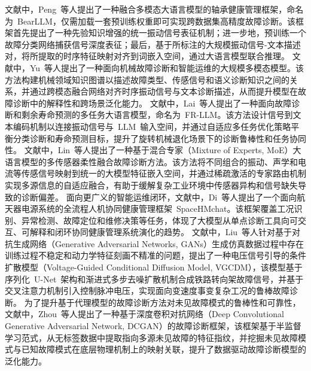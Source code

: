 文献\cite{Peng_Liu_Du_Gao_Wang_2025}中，Peng~等人提出了一种融合多模态大语言模型的轴承健康管理框架，命名为~BearLLM，仅需加载一套预训练权重即可实现跨数据集高精度故障诊断。该框架首先提出了一种先验知识增强的统一振动信号表征机制；进一步地，预训练一个故障分类网络捕获信号深度表征；最后，基于所标注的大规模振动信号-文本描述对，将所提取的时序特征映射对齐到词嵌入空间，通过大语言模型联合推理。
文献\cite{yu2026lmm_fd}中，Yu~等人提出了一种面向机械故障诊断和智能运维的大规模多模态模型。该方法构建机械领域知识图谱以描述故障类型、传感信号和语义诊断知识之间的关系，并通过跨模态融合网络对齐时序振动信号与文本诊断描述，从而提升模型在故障诊断中的解释性和跨场景泛化能力。
文献\cite{lai2026fr_llm}中，Lai~等人提出了一种面向故障诊断和剩余寿命预测的多任务大语言模型，命名为~FR-LLM。该方法设计信号到文本编码机制以连接振动信号与~LLM~输入空间，并通过自适应多任务优化策略平衡分类诊断和寿命预测目标，提升了旋转机械退化场景下的诊断鲁棒性和任务协同性。
文献\cite{lin2026moe_llm}中，Lin~等人提出了一种基于混合专家（Mixture of Experts, MoE）大语言模型的多传感器柔性融合故障诊断方法。该方法将不同组合的振动、声学和电流等传感信号映射到统一的大模型特征嵌入空间，并通过稀疏激活的专家路由机制实现多源信息的自适应融合，有助于缓解复杂工业环境中传感器异构和信号缺失导致的诊断偏差。
面向更广义的智能运维闭环，文献\cite{di2026spacehmchat}中，Di~等人提出了一个面向航天器电源系统的全流程人机协同健康管理框架~SpaceHMchat。该框架覆盖工况识别、异常检测、故障定位和维修决策等任务，体现了大模型从单点诊断工具向可交互、可解释和闭环协同健康管理系统演化的趋势。
文献\cite{VGCDM}中，Liu~等人针对基于对抗生成网络（Generative Adversarial Networks, GANs）生成仿真数据过程中存在训练过程不稳定和动力学特征刻画不精准的问题，提出了一种电压信号引导的条件扩散模型（Voltage-Guided Conditional Diffusion Model, VGCDM），该模型基于序列化~U-Net~架构和渐进式多步去噪扩散机制合成铁路转向架故障信号，并基于交叉注意力机制引入控制脉冲电压，实现面向变速度事变复杂工况的鲁棒故障诊断。
为了提升基于代理模型的故障诊断方法对未见故障模式的鲁棒性和可靠性，文献\cite{DCGAN}中，Zhou~等人提出了一种基于深度卷积对抗网络（Deep Convolutional Generative Adversarial Network, DCGAN）的故障诊断框架，该框架基于半监督学习范式，从无标签数据中提取指向多源未见故障的特征指纹，并挖掘未见故障模式与已知故障模式在底层物理机制上的映射关联，提升了数据驱动故障诊断模型的泛化能力。
